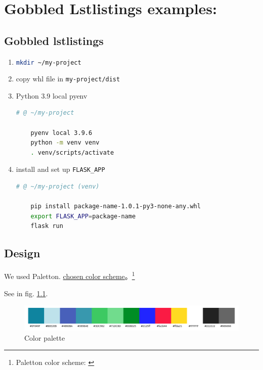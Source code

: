 \chapter{Gobbled Lstlistings examples:}\label{results}

\section{Gobbled lstlistings}

\begin{enumerate}
    \item \lstinline[language=bash]{mkdir ~/my-project}

    \item copy whl file in \lstinline{my-project/dist}

    \item Python 3.9 local pyenv

    \begin{lstlisting}[language=bash, title={small Execute in: bash}]
    # @ ~/my-project

    pyenv local 3.9.6
    python -m venv venv
    . venv/scripts/activate    
    \end{lstlisting}

    \item install and set up \lstinline{FLASK_APP}

    \begin{lstlisting}[language=bash, title={small Execute in: bash}]
    # @ ~/my-project (venv)

    pip install package-name-1.0.1-py3-none-any.whl
    export FLASK_APP=package-name
    flask run
    \end{lstlisting}

\end{enumerate}

\section{Design}

We used Paletton. \href{https://paletton.com/#uid=53n0u0kmgAe6fUpfzJrtUwl-jnK}{chosen color scheme}。\footnote{\label{paletton}Paletton color scheme: \href {https://paletton.com/\#uid=53n0u0kmgAe6fUpfzJrtUwl-jnK}{}}

See in fig. \ref{fig:color-palette}.

\begin{figure}[bh]
\centering
\includegraphics[width=0.6\linewidth]{figures/color-palette.png}
\caption{Color palette}
\label{fig:color-palette}
\end{figure}


